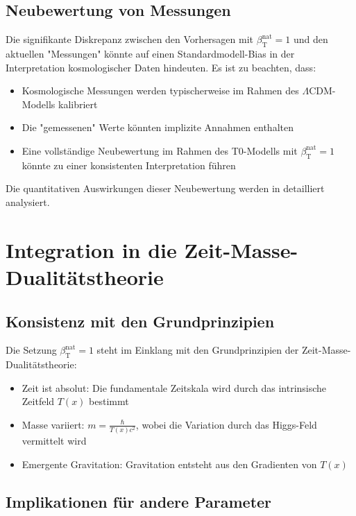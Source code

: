 \documentclass[12pt,a4paper]{article}
\newcommand{\Tfield}{T(x)}
\newcommand{\betaT}{\beta_{\text{T}}}
\begin{document}
	\subsection{Neubewertung von Messungen}
	
	Die signifikante Diskrepanz zwischen den Vorhersagen mit \(\betaT^{\text{nat}} = 1\) und den aktuellen "Messungen" könnte auf einen Standardmodell-Bias in der Interpretation kosmologischer Daten hindeuten. Es ist zu beachten, dass:
	
	\begin{itemize}
		\item Kosmologische Messungen werden typischerweise im Rahmen des \(\Lambda\)CDM-Modells kalibriert
		\item Die "gemessenen" Werte könnten implizite Annahmen enthalten
		\item Eine vollständige Neubewertung im Rahmen des T0-Modells mit \(\betaT^{\text{nat}} = 1\) könnte zu einer konsistenten Interpretation führen
	\end{itemize}
	
	Die quantitativen Auswirkungen dieser Neubewertung werden in \cite{pascher_alphabeta_2025} detailliert analysiert.
	
	\section{Integration in die Zeit-Masse-Dualitätstheorie}
	
	\subsection{Konsistenz mit den Grundprinzipien}
	
	Die Setzung \(\betaT^{\text{nat}} = 1\) steht im Einklang mit den Grundprinzipien der Zeit-Masse-Dualitätstheorie:
	\begin{itemize}
		\item Zeit ist absolut: Die fundamentale Zeitskala wird durch das intrinsische Zeitfeld \(\Tfield\) bestimmt
		\item Masse variiert: \(m = \frac{\hbar}{\Tfield c^2}\), wobei die Variation durch das Higgs-Feld vermittelt wird
		\item Emergente Gravitation: Gravitation entsteht aus den Gradienten von \(\Tfield\)
	\end{itemize}
	
	\subsection{Implikationen für andere Parameter}
	
\end{document}
